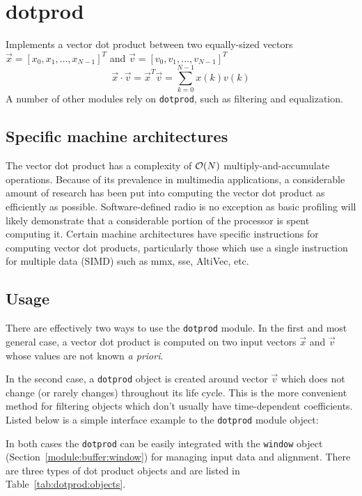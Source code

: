% 
%

\section{dotprod}
\label{module:dotprod}
Implements a vector dot product between two equally-sized vectors
$\vec{x} = \left[x_0,x_1,\ldots,x_{N-1}\right]^T$ and
$\vec{v} = \left[v_0,v_1,\ldots,v_{N-1}\right]^T$
\[
    \vec{x} \cdot \vec{v}   =
    \vec{x}^T \vec{v}       =
    \sum_{k=0}^{N-1}{ x(k) v(k) }
\]
A number of other modules rely on {\tt dotprod}, such as filtering and
equalization.

\subsection{Specific machine architectures}
\label{module:dotprod:arch}
The vector dot product has a complexity of $\mathcal{O}(N)$ multiply-and-accumulate
operations.
Because of its prevalence in multimedia applications, a considerable amount of
research has been put into computing the vector dot product as efficiently as
possible.
Software-defined radio is no exception as basic profiling will likely
demonstrate that a considerable portion of the processor is spent computing
it.
Certain machine architectures have specific instructions for computing vector
dot products, particularly those which use a single instruction for
multiple data (SIMD) such as mmx, sse, AltiVec, etc.

\subsection{Usage}
\label{module:dotprod:usage}
There are effectively two ways to use the {\tt dotprod} module.
In the first and most general case, a vector dot product is computed on two
input vectors $\vec{x}$ and $\vec{v}$ whose values are not known
{\it a priori}.

In the second case, a {\tt dotprod} object is created around vector $\vec{v}$
which does not change (or rarely changes) throughout its life cycle.
This is the more convenient method for filtering objects which don't usually
have time-dependent coefficients.
Listed below is a simple interface example to the {\tt dotprod} module
object:
%

%
In both cases the {\tt dotprod} can be easily integrated with the
{\tt window} object (Section~\ref{module:buffer:window})
for managing input data and alignment.
There are three types of dot product objects and are listed in
Table~\ref{tab:dotprod:objects}.

